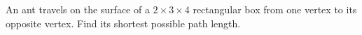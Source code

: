 An ant travels on the surface of a $2\times3\times4$ rectangular box from one vertex to its opposite vertex. Find its shortest possible path length.
